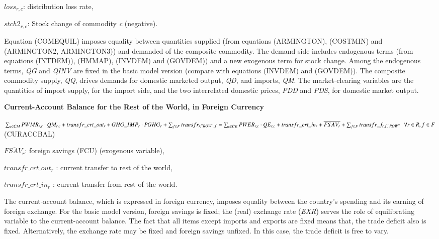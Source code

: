 \documentclass[10pt,a4paper,titlepage,dvipdfmx]{book}
\begin{document}
\begin{flushleft}
$loss_{r,c}$: distribution loss rate,

$stch2_{r,c}$: Stock change of commodity \textit{c} (negative).
\end{flushleft}

Equation (COMEQUIL) imposes equality between quantities supplied (from equations (ARMINGTON), (COSTMIN) and (ARMINGTON2, ARMINGTON3)) and demanded of the composite commodity. The demand side includes endogenous terms (from equations (INTDEM)), (HMMAP), (INVDEM) and (GOVDEM)) and a new exogenous term for stock change. Among the endogenous terms, \textit{QG} and \textit{QINV} are fixed in the basic model version (compare with equations (INVDEM) and (GOVDEM)). The composite commodity supply, \textit{QQ}, drives demands for domestic marketed output, \textit{QD}, and imports, \textit{QM}. The market-clearing variables are the quantities of import supply, for the import side, and the two interrelated domestic prices, \textit{PDD} and \textit{PDS}, for domestic market output.

\begin{flushleft}\textbf{Current-Account Balance for the Rest of the World, in Foreign Currency}\end{flushleft}


\begin{center}$\sum _{c\in CM}PWMR_{r,c}\cdot QM_{r,c}+transfr\_ crt\_ out_{r}+GHG\_ IMP_{r}\cdot PGHG_{r}+\sum _{f\in F}transfr_{r,"ROW",f}\newline =\sum _{c\in CE}PWER_{r,c}\cdot QE_{r,c}+transfr\_ crt\_ in_{r}+\overline{FSAV_{r}}+\sum _{f\in F}transfr\_ f_{r,f,"ROW"}\,\,\,\,\forall r\in R,f\in F$ (CURACCBAL)
\end{center}

\begin{flushleft}
$\overline{FSAV_{r}}$: foreign savings (FCU) (exogenous variable),

$transfr\_crt\_out_{r}$ : current transfer to rest of the world,

$transfr\_crt\_in_{r}$ : current transfer from rest of the world.
\end{flushleft}

The current-account balance, which is expressed in foreign currency, imposes equality between the country's spending and its earning of foreign exchange. For the basic model version, foreign savings is fixed; the (real) exchange rate (\textit{EXR}) serves the role of equilibrating variable to the current-account balance. The fact that all items except imports and exports are fixed means that, the trade deficit also is fixed. Alternatively, the exchange rate may be fixed and foreign savings unfixed. In this case, the trade deficit is free to vary.
\end{document}
